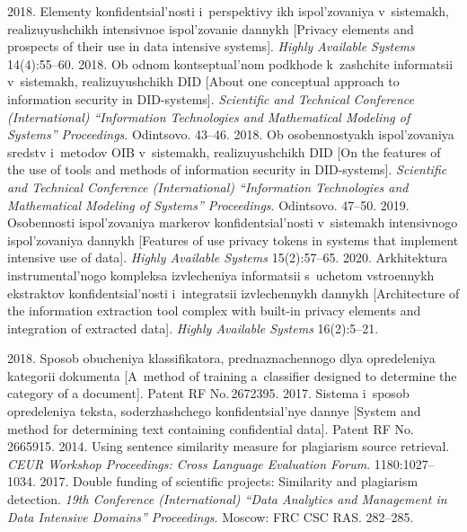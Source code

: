 \begin{multicols}{2}
{{\begin{thebibliography}{99}
 2018. Elementy konfidentsial'nosti 
i~perspektivy ikh ispol'zovaniya v~sistemakh, realizuyushchikh intensivnoe ispol'zovanie dannykh 
[Privacy elements and prospects of their use in data intensive
systems]. 
\textit{Highly Available Systems} 14(4):55--60.
 2018. Ob odnom kontseptual'nom 
podkhode k~zashchite in\-for\-ma\-tsii v~sistemakh, realizuyushchikh DID [About one conceptual approach to 
information security in DID-systems]. \textit{Scientific and Technical Conference 
(International) ``Information Technologies and Mathematical Modeling of Systems'' Proceedings}. 
Odintsovo. 43--46. 
 2018. Ob osobennostyakh ispol'zovaniya 
sredstv i~metodov OIB v~sistemakh, realizuyushchikh DID [On the features of the use of tools and 
methods of information security in DID-systems]. \textit{Scientific and Technical Conference (International) ``Information Technologies and Mathematical 
Modeling of Systems'' Proceedings}. Odintsovo. 47--50.
 2019. Osobennosti ispol'zovaniya markerov 
konfidentsial'nosti v~sistemakh intensivnogo ispol'zovaniya dannykh [Features of use privacy 
tokens in systems that implement intensive use of data]. \textit{Highly Available Systems} 
15(2):57--65.
 2020. Arkhitektura instrumental'nogo 
kompleksa izvlecheniya informatsii s~uchetom vstroennykh ekstraktov konfidentsial'nosti i~integratsii 
izvlechennykh dannykh [Architecture of the information extraction tool complex with built-in privacy 
elements and integration of extracted data]. \textit{Highly Available Systems}  
16(2):5--21.

 2018. Sposob 
obucheniya klassifikatora, prednaznachennogo dlya opredeleniya kategorii dokumenta [A~method of 
training a~classifier designed to determine the category of a document]. Patent RF No.\,2672395.
 2017. Sistema i~sposob opredeleniya teks\-ta, soderzhashchego konfidentsial'nye 
dannye [System and method for determining text containing confidential data]. Patent RF No.\,2665915.
 2014. Using sentence similarity measure for plagiarism 
source retrieval. \textit{CEUR Workshop Proceedings: Cross Language Evaluation Forum}. 
1180:1027--1034. 
 2017. Double 
funding of scientific projects: Similarity and plagiarism detection. \textit{19th  
Conference (International) ``Data Analytics and Management in Data Intensive Domains'' Proceedings}. 
Moscow: FRC CSC RAS. 282--285.

\end{thebibliography}

 }
 }

\end{multicols}

